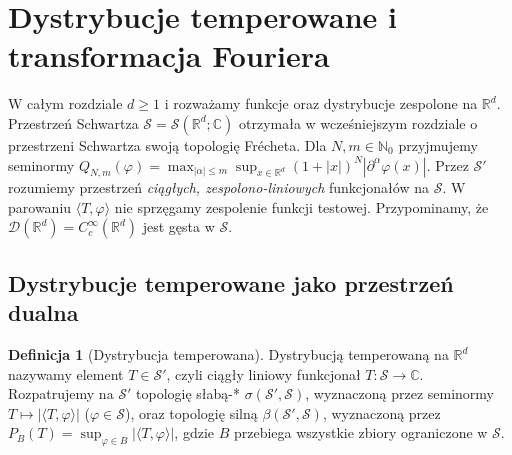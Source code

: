 \documentclass[11pt,a4paper]{article}
\numberwithin{equation}{section}
\theoremstyle{plain}
\theoremstyle{definition}
\newtheorem{definicja}[twierdzenie]{Definicja}
\theoremstyle{remark}
\newcommand{\R}{\mathbb R}
\newcommand{\C}{\mathbb C}
\newcommand{\N}{\mathbb N}
\begin{document}
\section{Dystrybucje temperowane i transformacja Fouriera}
\label{sec:temperowane22}

W całym rozdziale $d\ge 1$ i rozważamy funkcje oraz dystrybucje
zespolone na $\R^d$. Przestrzeń Schwartza
$\mathcal S=\mathcal S(\R^d;\C)$ otrzymała w
wcześniejszym rozdziale o przestrzeni Schwartza swoją topologię Frécheta.
Dla $N,m\in\N_0$ przyjmujemy seminormy
$Q_{N,m}(\varphi)=\max_{|\alpha|\le m}\sup_{x\in\R^d}
(1+|x|)^N|\partial^\alpha\varphi(x)|$.
Przez $\mathcal S'$ rozumiemy przestrzeń \emph{ciągłych,
zespolono-liniowych} funkcjonałów na $\mathcal S$.
W parowaniu $\langle T,\varphi\rangle$ nie sprzęgamy zespolenie
funkcji testowej. Przypominamy, że
$\mathcal D(\R^d)=C_c^\infty(\R^d)$ jest gęsta w $\mathcal S$.

\subsection{Dystrybucje temperowane jako przestrzeń dualna}

\begin{definicja}[Dystrybucja temperowana]
\label{def:tempered22}
Dystrybucją temperowaną na $\R^d$ nazywamy element
$T\in\mathcal S'$, czyli ciągły liniowy funkcjonał
$T:\mathcal S\to\C$. Rozpatrujemy na $\mathcal S'$ topologię
słabą-* $\sigma(\mathcal S',\mathcal S)$, wyznaczoną przez
seminormy $T\mapsto|\langle T,\varphi\rangle|$
($\varphi\in\mathcal S$), oraz topologię silną
$\beta(\mathcal S',\mathcal S)$, wyznaczoną przez
$P_B(T)=\sup_{\varphi\in B}|\langle T,\varphi\rangle|$,
gdzie $B$ przebiega wszystkie zbiory ograniczone w $\mathcal S$.
\end{definicja}
\end{document}
